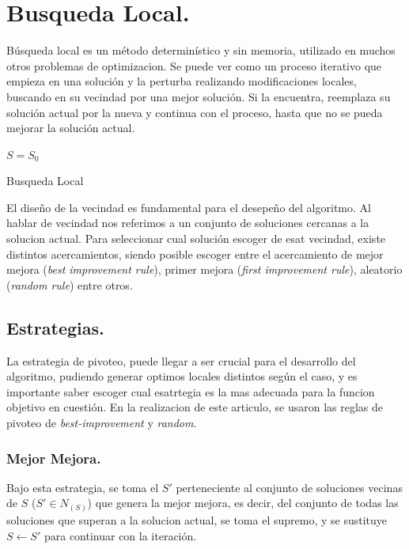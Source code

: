 \documentclass{ci5652}
\begin{document}
\section{Busqueda Local.}
	Búsqueda local es un método determinístico y sin memoria, utilizado en muchos otros problemas de optimizacion. Se puede ver como un proceso iterativo que empieza en una solución y la perturba realizando modificaciones locales, buscando en su vecindad por una mejor solución. Si la encuentra, reemplaza su solución actual por la nueva y continua con el proceso, hasta que no se pueda mejorar la solución actual.\\

	\begin{algorithm}
		\DontPrintSemicolon
		\vspace*{0.1cm}
		$S = S_0$\;
		\vspace*{0.1cm}
		\caption{Busqueda Local}
	\end{algorithm}
		

	El diseño de la vecindad es fundamental para el desepeño del algoritmo. Al hablar de vecindad nos referimos a un conjunto de soluciones cercanas a la solucion actual. Para seleccionar cual solución escoger de esat vecindad, existe distintos acercamientos, siendo posible escoger entre el acercamiento de mejor mejora (\textit{best improvement rule}), primer mejora (\textit{first improvement rule}), aleatorio (\textit{random rule}) entre otros.\\

	\subsection{Estrategias.} 
		La estrategia de pivoteo, puede llegar a ser crucial para el desarrollo del algoritmo, pudiendo generar optimos locales distintos según el caso, y es importante saber escoger cual esatrtegia es la mas adecuada para la funcion objetivo en cuestión.
		En la realizacion de este articulo, se usaron las reglas de pivoteo de \textit{best-improvement} y \textit{random}.
		
		\subsubsection{Mejor Mejora.}
			Bajo esta estrategia, se toma el $S'$ perteneciente al conjunto de soluciones vecinas de $S$ ($S' \in N_{(S)}$) que genera la mejor mejora, es decir, del conjunto de todas las soluciones que superan a la solucion actual, se toma el supremo, y se sustituye $S \leftarrow S'$ para continuar con la iteración.
		
\end{document}
